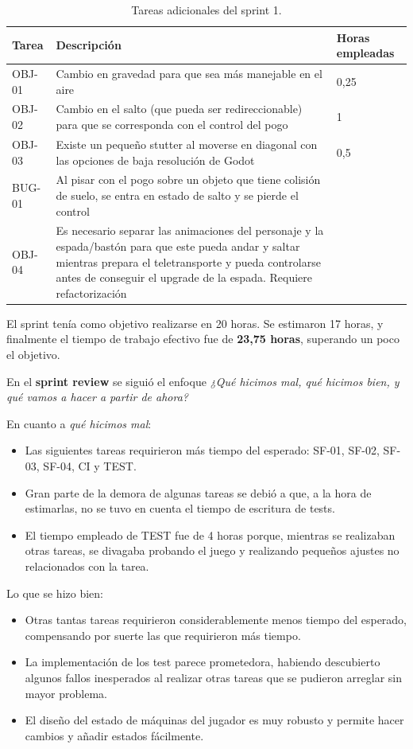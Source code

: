 \begin{table}[htb]
    \centering
    \begin{tabular}{|l|p{8cm}|l|}
    \hline
        Tarea & Descripción & Horas empleadas \\ \hline
        OBJ-01 & Cambio en gravedad para que sea más manejable en el aire & 0,25 \\ \hline
        OBJ-02 & Cambio en el salto (que pueda ser redireccionable) para que se corresponda con el control del pogo & 1 \\ \hline
        OBJ-03 & Existe un pequeño stutter al moverse en diagonal con las opciones de baja resolución de Godot & 0,5 \\ \hline
        BUG-01 & Al pisar con el pogo sobre un objeto que tiene colisión de suelo, se entra en estado de salto y se pierde el control & ~ \\ \hline
        OBJ-04 & Es necesario separar las animaciones del personaje y la espada/bastón para que este pueda andar y saltar mientras prepara el teletransporte y pueda controlarse antes de conseguir el upgrade de la espada. Requiere refactorización & ~ \\ \hline
    \end{tabular}
    \caption{Tareas adicionales del sprint 1.}
    \label{tab:aditionalsprint1task}
\end{table}

El sprint tenía como objetivo realizarse en 20 horas. Se estimaron 17 horas, y finalmente el tiempo de trabajo efectivo fue de \textbf{23,75 horas}, superando un poco el objetivo.

En el \textbf{sprint review} se siguió el enfoque \textit{¿Qué hicimos mal, qué hicimos bien, y qué vamos a hacer a partir de ahora?}

En cuanto a \textit{qué hicimos mal}:
\begin{itemize}
    \item Las siguientes tareas requirieron más tiempo del esperado: SF-01, SF-02, SF-03, SF-04, CI y TEST.
    \item Gran parte de la demora de algunas tareas se debió a que, a la hora de estimarlas, no se tuvo en cuenta el tiempo de escritura de tests.
    \item El tiempo empleado de TEST fue de 4 horas porque, mientras se realizaban otras tareas, se divagaba probando el juego y realizando pequeños ajustes no relacionados con la tarea.
\end{itemize}

Lo que se hizo bien:
\begin{itemize}
    \item Otras tantas tareas requirieron considerablemente menos tiempo del esperado, compensando por suerte las que requirieron más tiempo.
    \item La implementación de los test parece prometedora, habiendo descubierto algunos fallos inesperados al realizar otras tareas que se pudieron arreglar sin mayor problema.
    \item El diseño del estado de máquinas del jugador es muy robusto y permite hacer cambios y añadir estados fácilmente.
\end{itemize}


